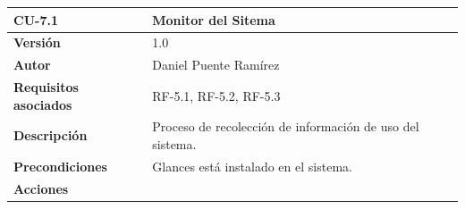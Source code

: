 \begin{longtable}[H]{@{}ll@{}}
\toprule
\begin{minipage}[b]{0.23\columnwidth}\raggedright\strut
\textbf{CU-7.1}\strut
\end{minipage} & \begin{minipage}[b]{0.71\columnwidth}\raggedright\strut
\textbf{Monitor del Sitema}\strut
\end{minipage}\tabularnewline
\midrule
\endhead
\begin{minipage}[t]{0.23\columnwidth}\raggedright\strut
\textbf{Versión}\strut
\end{minipage} & \begin{minipage}[t]{0.71\columnwidth}\raggedright\strut
1.0\strut
\end{minipage}\tabularnewline
\begin{minipage}[t]{0.23\columnwidth}\raggedright\strut
\textbf{Autor}\strut
\end{minipage} & \begin{minipage}[t]{0.71\columnwidth}\raggedright\strut
Daniel Puente Ramírez\strut
\end{minipage}\tabularnewline
\begin{minipage}[t]{0.23\columnwidth}\raggedright\strut
\textbf{Requisitos asociados}\strut
\end{minipage} & \begin{minipage}[t]{0.71\columnwidth}\raggedright\strut
RF-5.1, RF-5.2, RF-5.3\strut
\end{minipage}\tabularnewline
\begin{minipage}[t]{0.23\columnwidth}\raggedright\strut
\textbf{Descripción}\strut
\end{minipage} & \begin{minipage}[t]{0.71\columnwidth}\raggedright\strut
Proceso de recolección de información de uso del sistema.\strut
\end{minipage}\tabularnewline
\begin{minipage}[t]{0.23\columnwidth}\raggedright\strut
\textbf{Precondiciones}\strut
\end{minipage} & \begin{minipage}[t]{0.71\columnwidth}\raggedright\strut
Glances está instalado en el sistema.\strut
\end{minipage}\tabularnewline
\begin{minipage}[t]{0.23\columnwidth}\raggedright\strut
\textbf{Acciones}\strut
\end{minipage} & \begin{minipage}[t]{0.71\columnwidth}\raggedright\strut

\end{minipage}
\end{longtable}
